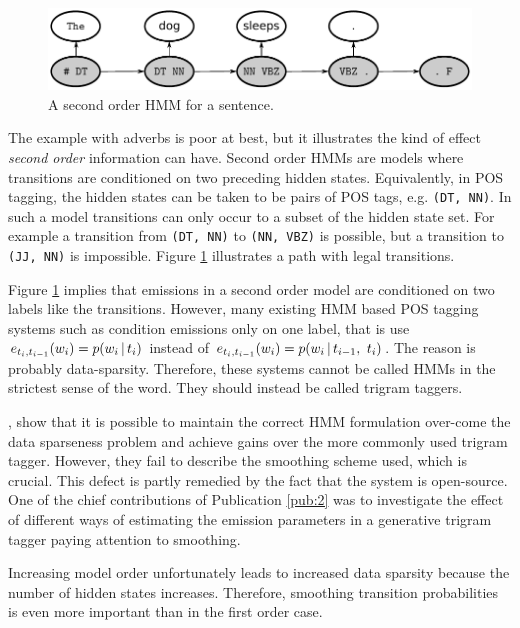 \begin{figure}[!htb]
\begin{center}
\includegraphics[scale=.7]{snd_order_path}
\caption{A second order HMM for a sentence.}\label{second-order-fig}
\end{center}
\end{figure}

The example with adverbs is poor at best, but it illustrates the kind
of effect {\it second order} information can have. Second order HMMs
are models where transitions are conditioned on two preceding hidden
states. Equivalently, in POS tagging, the hidden states can be taken
to be pairs of POS tags, e.g. {\tt (DT, NN)}. In such a model
transitions can only occur to a subset of the hidden state set. For
example a transition from {\tt (DT, NN)} to {\tt (NN, VBZ)} is possible,
but a transition to {\tt (JJ, NN)} is impossible. Figure
\ref{second-order-fig} illustrates a path with legal transitions. 

Figure \ref{second-order-fig} implies that emissions in a second order
model are conditioned on two labels like the transitions. However,
many existing HMM based POS tagging systems such as \cite{Brants2000}
condition emissions only on one label, that is use $e_{t_i, t_{i -
    1}}(w_i) = p(w_i \mbox{$ \, | \, $} t_i)$ instead of $e_{t_i, t_{i - 1}}(w_i) =
p(w_i \mbox{$ \, | \, $} t_{i - 1},\ t_{i})$. The reason is probably
data-sparsity. Therefore, these systems cannot be called HMMs in the
strictest sense of the word. They should instead be called trigram
taggers. 

\cite{Halacsy2007}, show that it is possible to maintain the correct
HMM formulation over-come the data sparseness problem and achieve
gains over the more commonly used trigram tagger. However, they fail
to describe the smoothing scheme used, which is crucial. This defect
is partly remedied by the fact that the system is open-source.  One of
the chief contributions of Publication \ref{pub:2} was to investigate
the effect of different ways of estimating the emission parameters in
a generative trigram tagger paying attention to smoothing.
 
Increasing model order unfortunately leads to increased data sparsity
because the number of hidden states increases. Therefore, smoothing
transition probabilities is even more important than in the first
order case. %

